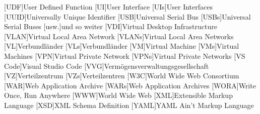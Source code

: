\begin{acronym}[]
        [UDF]{User Defined Function}
        [UI]{User Interface}
        [UIs]{User Interfaces}
        [UUID]{Universally Unique Identifier}
        [USB]{Universal Serial Bus}
        [USBs]{Universal Serial Buses}
        [usw.]{und so weiter}
        [VDI]{Virtual Desktop Infrastructure}
        [VLAN]{Virtual Local Area Network}
        [VLANs]{Virtual Local Area Networks}
        [VL]{Verbundländer}
        [VLs]{Verbundländer}
        [VM]{Virtual Machine}
        [VMs]{Virtual Machines}
        [VPN]{Virtual Private Network}
        [VPNs]{Virtual Private Networks}
        [VS Code]{Visual Studio Code}
        [VVG]{Vermögensverwaltungsgesellschaft}
        [VZ]{Verteilzentrum}
        [VZs]{Verteilzentren}
        [W3C]{World Wide Web Consortium}
        [WAR]{Web Application Archive}
        [WARs]{Web Application Archives}
        [WORA]{Write Once, Run Anywhere}
        [WWW]{World Wide Web}
        [XML]{Extensible Markup Language}
        [XSD]{XML Schema Definition}
        [YAML]{YAML Ain't Markup Language}
    \end{acronym}